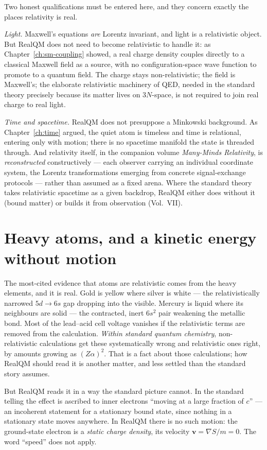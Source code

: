 Two honest qualifications must be entered here, and they concern exactly the places relativity is real.

\emph{Light.} Maxwell's equations \emph{are} Lorentz invariant, and light is a relativistic object. But RealQM
does not need to become relativistic to handle it: as Chapter~\ref{ch:sm-coupling} showed, a real charge density
couples directly to a classical Maxwell field as a source, with no configuration-space wave function to promote to
a quantum field. The charge stays non-relativistic; the field is Maxwell's; the elaborate relativistic machinery
of QED, needed in the standard theory precisely because its matter lives on $3N$-space, is not required to join
real charge to real light.

\emph{Time and spacetime.} RealQM does not presuppose a Minkowski background. As Chapter~\ref{ch:time} argued,
the quiet atom is timeless and time is relational, entering only with motion; there is no spacetime manifold the
state is threaded through. And relativity itself, in the companion volume \emph{Many-Minds Relativity}, is
\emph{reconstructed} constructively --- each observer carrying an individual coordinate system, the Lorentz
transformations emerging from concrete signal-exchange protocols --- rather than assumed as a fixed arena. Where
the standard theory takes relativistic spacetime as a given backdrop, RealQM either does without it (bound matter)
or builds it from observation (Vol.~VII).

\section{Heavy atoms, and a kinetic energy without motion}\label{sec:heavy-atoms}

The most-cited evidence that atoms are relativistic comes from the heavy elements, and it is real. Gold is
yellow where silver is white --- the relativistically narrowed $5d\to6s$ gap dropping into the visible. Mercury
is liquid where its neighbours are solid --- the contracted, inert $6s^2$ pair weakening the metallic bond. Most
of the lead--acid cell voltage vanishes if the relativistic terms are removed from the calculation.
\emph{Within standard quantum chemistry}, non-relativistic calculations get these systematically wrong and
relativistic ones right, by amounts growing as $(Z\alpha)^2$. That is a fact about those calculations; how RealQM
should read it is another matter, and less settled than the standard story assumes.

But RealQM reads it in a way the standard picture cannot. In the standard telling the effect is ascribed to
inner electrons ``moving at a large fraction of $c$'' --- an incoherent statement for a stationary bound state,
since nothing in a stationary state moves anywhere. In RealQM there is no such motion: the ground-state electron
is a \emph{static charge density}, its velocity $\mathbf v=\nabla S/m=0$. The word ``speed'' does not apply.


